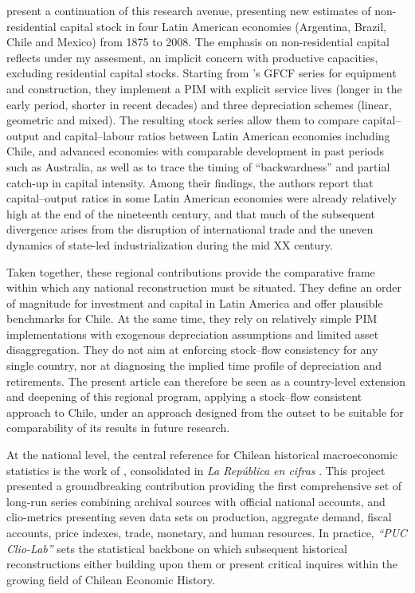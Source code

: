 \documentclass[11pt,a4paper]{article}
\begin{document}
\citet{TafunellDucoing2016} present a continuation of this research avenue, presenting new estimates of non-residential capital stock in four Latin American economies (Argentina, Brazil, Chile and Mexico) from 1875 to 2008. The emphasis on non-residential capital reflects under my assesment, an implicit concern with productive capacities, excluding residential capital stocks. Starting from \citet{Tafunell2013}'s GFCF series for equipment and construction, they implement a PIM with explicit service lives (longer in the early period, shorter in recent decades) and three depreciation schemes (linear, geometric and mixed). The resulting stock series allow them to compare capital--output and capital--labour ratios between Latin American economies including Chile, and advanced economies with comparable development in past periods such as Australia, as well as to trace the timing of ``backwardness'' and partial catch-up in capital intensity. Among their findings, the authors report that capital--output ratios in some Latin American economies were already relatively high at the end of the nineteenth century, and that much of the subsequent divergence arises from the disruption of international trade and the uneven dynamics of state-led industrialization during the mid XX century. 

Taken together, these regional contributions provide the comparative frame within which any national reconstruction must be situated. They define an order of magnitude for investment and capital in Latin America and offer plausible benchmarks for Chile. At the same time, they rely on relatively simple PIM implementations with exogenous depreciation assumptions and limited asset disaggregation. They do not aim at enforcing stock--flow consistency for any single country, nor at diagnosing the implied time profile of depreciation and retirements. The present article can therefore be seen as a country-level extension and deepening of this regional program, applying a stock--flow consistent approach to Chile, under an approach designed from the outset to be suitable for comparability of its results in future research. 

At the national level, the central reference for Chilean historical macroeconomic statistics is the work of \citet{DiazWagner2016}, consolidated in \emph{La Rep\'{u}blica en cifras} \citep{Luders2016}. This project presented a groundbreaking contribution providing the first comprehensive set of long-run series combining archival sources with official national accounts, and clio-metrics presenting seven data sets on production, aggregate demand, fiscal accounts, price indexes, trade, monetary, and human resources. In practice, \emph{``PUC Clio-Lab''} sets the statistical backbone on which subsequent historical reconstructions either building upon them or present critical inquires within the growing field of Chilean Economic History.
\end{document}

